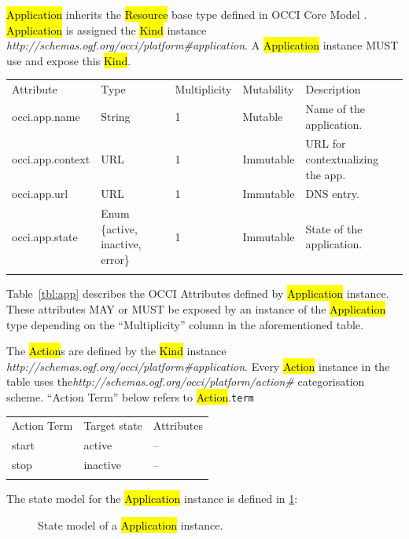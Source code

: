 \documentclass[10pt,a4paper]{article}
\begin{document}
\hl{Application} inherits the \hl{Resource} base type defined in OCCI Core Model \cite{occi:core}. \hl{Application} is assigned the \hl{Kind} instance \textit{http://schemas.ogf.org/occi/platform\#application}. A \hl{Application} instance MUST use and expose this \hl{Kind}.

{
	\begin{tabular}{lp{2.5cm}p{1cm}lp{5cm}}
	\toprule
	Attribute&Type&Multi\-plicity&Mutability&Description\\
	\colrule
	occi.app.name & String & 1 & Mutable & Name of the application.\\
	occi.app.context & URL & 1 & Immutable & URL for contextualizing the app.\\
	occi.app.url & URL & 1 & Immutable & DNS entry.\\
	occi.app.state & Enum \{active, inactive, error\} & 1 & Immutable & State of the application.\\
	\botrule
	\end{tabular}
}

Table~\ref{tbl:app} describes the OCCI Attributes defined by \hl{Application} instance. These attributes MAY or MUST be exposed by an instance of the \hl{Application} type depending on the ``Multiplicity'' column in the aforementioned table.

The \hl{Action}s are defined by the \hl{Kind} instance \textit{http://schemas.ogf.org/occi/platform\#application}. Every \hl{Action} instance in the table uses the\textit{http://schemas.ogf.org/occi/platform/action\#} categorisation scheme. ``Action Term'' below refers to \hl{Action}.{\tt term}

{
	\begin{tabular}{lll}
	\toprule
	Action Term & Target state & Attributes \\
	\colrule
	start & active & -- \\
	stop & inactive & -- \\
	\botrule
	\end{tabular}
}

The state model for the \hl{Application} instance is defined in \ref{fig:app_state}:

\begin{figure}[!h]
	{\centering {} \par}
	\caption{State model of a \hl{Application} instance.}
	\label{fig:app_state}
\end{figure}
\end{document}
